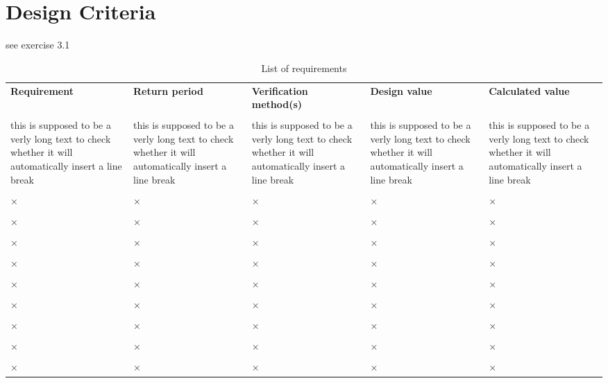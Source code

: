 \chapter{Design Criteria}

see exercise 3.1

\begin{center}
\begin{table}[!htb]
\begin{tabu}{X[2l] X[1c] X[2c] X[1c] X[1c]}
\textbf{Requirement} & \textbf{Return period} & \textbf{Verification method(s)} & \textbf{Design value} & \textbf{Calculated value}\\
\\
\toprule[2pt]
this is supposed to be a verly long text to check whether it will automatically insert a line break & this is supposed to be a verly long text to check whether it will automatically insert a line break & this is supposed to be a verly long text to check whether it will automatically insert a line break & this is supposed to be a verly long text to check whether it will automatically insert a line break & this is supposed to be a verly long text to check whether it will automatically insert a line break\\
\\
× & × & × & × & ×\\
\\
× & × & × & × & ×\\
\\
× & × & × & × & ×\\
\\
× & × & × & × & ×\\
\\
× & × & × & × & ×\\
\\
× & × & × & × & ×\\
\\
× & × & × & × & ×\\
\\
× & × & × & × & ×\\
\\
× & × & × & × & ×\\
\bottomrule[2pt]
\end{tabu}
\caption{List of requirements}
\label{tab:requirements}
\end{table}
\end{center}
